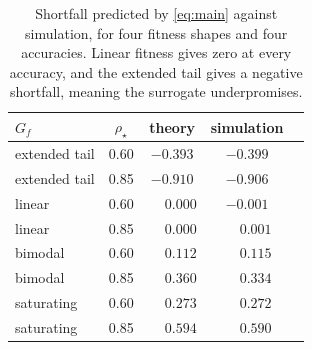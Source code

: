 \documentclass{article}
\theoremstyle{plain}
\theoremstyle{definition}
\begin{document}
\begin{table}[ht]
\caption{Shortfall predicted by \cref{eq:main} against simulation, for four fitness
shapes and four accuracies. Linear fitness gives zero at every accuracy, and the
extended tail gives a negative shortfall, meaning the surrogate underpromises.}
\label{tab:theory}
\vskip 0.1in
\begin{center}
\begin{small}
\begin{tabular}{lcccc}
\toprule
$G_{\!f}$ & $\rho_\star$ & theory & simulation \\
\midrule
extended tail & 0.60 & $-0.393$ & $-0.399$ \\
extended tail & 0.85 & $-0.910$ & $-0.906$ \\
linear        & 0.60 & $\phantom{-}0.000$ & $-0.001$ \\
linear        & 0.85 & $\phantom{-}0.000$ & $\phantom{-}0.001$ \\
bimodal       & 0.60 & $\phantom{-}0.112$ & $\phantom{-}0.115$ \\
bimodal       & 0.85 & $\phantom{-}0.360$ & $\phantom{-}0.334$ \\
saturating    & 0.60 & $\phantom{-}0.273$ & $\phantom{-}0.272$ \\
saturating    & 0.85 & $\phantom{-}0.594$ & $\phantom{-}0.590$ \\
\bottomrule
\end{tabular}
\end{small}
\end{center}
\vskip -0.1in
\end{table}
\end{document}
